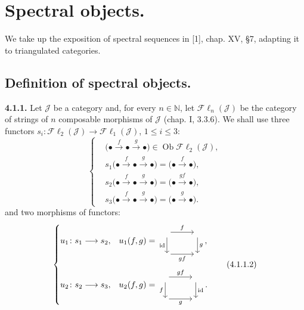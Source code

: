\clearpage
{}%
\begingroup\small\setlength{\parskip}{0pt}\setlength{\emergencystretch}{1.5em}
\section{Spectral objects.}

We take up the exposition of spectral sequences in [1], chap. XV, \S 7,
adapting it to triangulated categories.

\subsection{Definition of spectral objects.}

\medskip\noindent\textbf{4.1.1.}\quad
Let $\mathcal J$ be a category and, for every $n\in\mathbb N$, let
$\mathcal{F}\ell_n(\mathcal J)$ be the category of strings of $n$ composable
morphisms of $\mathcal J$ (chap. I, 3.3.6). We shall use three functors
$s_i\colon\mathcal{F}\ell_2(\mathcal J)\to\mathcal{F}\ell_1(\mathcal J)$,
$1\leq i\leq3$:
\[
\left\{
\begin{aligned}
&\bigl(\mathord\bullet\xrightarrow f\mathord\bullet\xrightarrow g\mathord\bullet\bigr)
   \in\operatorname{Ob}\mathcal{F}\ell_2(\mathcal J),\\
&s_1\bigl(\mathord\bullet\xrightarrow f\mathord\bullet\xrightarrow g\mathord\bullet\bigr)
   =\bigl(\mathord\bullet\xrightarrow f\mathord\bullet\bigr),\\
&s_2\bigl(\mathord\bullet\xrightarrow f\mathord\bullet\xrightarrow g\mathord\bullet\bigr)
   =\bigl(\mathord\bullet\xrightarrow{gf}\mathord\bullet\bigr),\\
&s_3\bigl(\mathord\bullet\xrightarrow f\mathord\bullet\xrightarrow g\mathord\bullet\bigr)
   =\bigl(\mathord\bullet\xrightarrow g\mathord\bullet\bigr).
\end{aligned}
\right.
\tag{4.1.1.1}
\]
and two morphisms of functors:
\[
\left\{
\begin{aligned}
&u_1\colon s_1\longrightarrow s_2,
&&u_1(f,g)=
\begin{tikzcd}[ampersand replacement=\&,column sep=2.8em,row sep=1.9em,baseline=(current bounding box.center)]
{}\arrow[r,"f"]\arrow[d,"\operatorname{id}"']\&{}\arrow[d,"g"]\\
{}\arrow[r,"gf"']\&{}
\end{tikzcd},\\[2pt]
&u_2\colon s_2\longrightarrow s_3,
&&u_2(f,g)=
\begin{tikzcd}[ampersand replacement=\&,column sep=2.8em,row sep=1.9em,baseline=(current bounding box.center)]
{}\arrow[r,"gf"]\arrow[d,"f"']\&{}\arrow[d,"\operatorname{id}"]\\
{}\arrow[r,"g"']\&{}
\end{tikzcd}.
\end{aligned}
\right.
\tag{4.1.1.2}
\]

